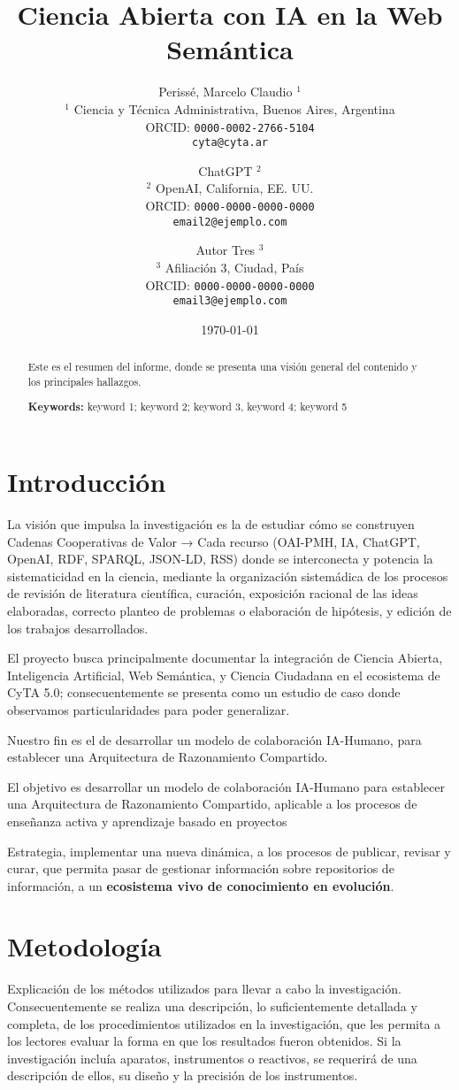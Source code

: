 \documentclass[a4paper,12pt]{article}
\title{Ciencia Abierta con IA en la Web Semántica}
\author{
Perissé, Marcelo Claudio $^{1}$ \\
\small $^1$ Ciencia y Técnica Administrativa, Buenos Aires, Argentina \\
\small ORCID: \texttt{0000-0002-2766-5104} \\
\small \texttt{cyta@cyta.ar} 
\and
ChatGPT $^{2}$ \\
\small $^2$ OpenAI, California, EE. UU. \\
\small ORCID: \texttt{0000-0000-0000-0000} \\
\small \texttt{email2@ejemplo.com} 
\and
Autor Tres $^{3}$\\
\small $^3$ Afiliación 3, Ciudad, País \\
\small ORCID: \texttt{0000-0000-0000-0000} \\
\small \texttt{email3@ejemplo.com} 
}
\date{\today}
\begin{document}
\maketitle

\begin{abstract}
Este es el resumen del informe, donde se presenta una visión general del contenido y los principales hallazgos.

\textbf{Keywords:} keyword 1; keyword 2; keyword 3, keyword 4; keyword 5
\end{abstract}

\section{Introducción}
La visión que impulsa la investigación es la de estudiar cómo se construyen Cadenas Cooperativas de Valor → Cada recurso (OAI-PMH, IA, ChatGPT, OpenAI, RDF, SPARQL, JSON-LD, RSS) donde se interconecta y potencia la sistematicidad en la ciencia, mediante la organización sistemádica de los procesos de revisión de literatura científica, curación, exposición racional de las ideas elaboradas, correcto planteo de problemas o elaboración de hipótesis, y edición de los trabajos desarrollados.\cite{Sabino1992}

El proyecto busca principalmente documentar la integración de Ciencia Abierta, Inteligencia Artificial, Web Semántica, y Ciencia Ciudadana en el ecosistema de CyTA 5.0; consecuentemente se presenta como un estudio de caso donde observamos particularidades para poder generalizar.


Nuestro fin es el de desarrollar un modelo de colaboración IA-Humano, para establecer una Arquitectura de Razonamiento Compartido.

El objetivo es desarrollar un modelo de colaboración IA-Humano para establecer una Arquitectura de Razonamiento Compartido, aplicable a los procesos de enseñanza activa y aprendizaje basado en proyectos

Estrategia, implementar una nueva dinámica, a los procesos de publicar, revisar y curar, que permita pasar de gestionar información sobre repositorios de información, a un \textbf{ecosistema vivo de conocimiento en evolución}.


\section{Metodología}
Explicación de los métodos utilizados para llevar a cabo la investigación. Consecuentemente se realiza una descripción, lo suficientemente detallada y completa, de los procedimientos utilizados en la investigación, que les permita a los lectores evaluar la forma en que los resultados fueron obtenidos.
Si la investigación incluía aparatos, instrumentos o reactivos, se requerirá de una descripción de ellos, su diseño y la precisión de los instrumentos.
\end{document}
